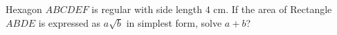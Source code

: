 Hexagon $ABCDEF$ is regular with side length $4$ cm. If the area of Rectangle $ABDE$ is expressed as $a\sqrt{b}$ in simplest form, solve $a+b$?
